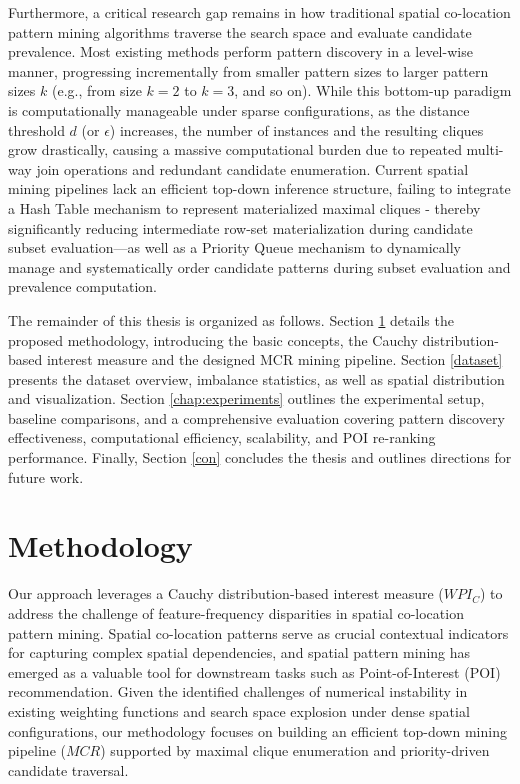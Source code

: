\documentclass[12pt, letterpaper]{template}
\theoremstyle{definition}
\begin{document}
Furthermore, a critical research gap remains in how traditional spatial co-location pattern mining algorithms traverse the search space and evaluate candidate prevalence. Most existing methods perform pattern discovery in a level-wise manner, progressing incrementally from smaller pattern sizes to larger pattern sizes $k$ (e.g., from size $k=2$ to $k=3$, and so on). While this bottom-up paradigm is computationally manageable under sparse configurations, as the distance threshold $d$ (or $\epsilon$) increases, the number of instances and the resulting cliques grow drastically, causing a massive computational burden due to repeated multi-way join operations and redundant candidate enumeration. Current spatial mining pipelines lack an efficient top-down inference structure, failing to integrate a Hash Table mechanism to represent materialized maximal cliques - thereby significantly reducing intermediate row-set materialization during candidate subset evaluation—as well as a Priority Queue mechanism to dynamically manage and systematically order candidate patterns during subset evaluation and prevalence computation. \cite{maurer1975hash}

The remainder of this thesis is organized as follows. Section \ref{methodology} details the proposed methodology, introducing the basic concepts, the Cauchy distribution-based interest measure and the designed MCR mining pipeline. Section \ref{dataset} presents the dataset overview, imbalance statistics, as well as spatial distribution and visualization. Section \ref{chap:experiments} outlines the experimental setup, baseline comparisons, and a comprehensive evaluation covering pattern discovery effectiveness, computational efficiency, scalability, and POI re-ranking performance. Finally, Section \ref{con} concludes the thesis and outlines directions for future work.

\section{Methodology} \label{methodology}

Our approach leverages a Cauchy distribution-based interest measure ($WPI_C$) to address the challenge of feature-frequency disparities in spatial co-location pattern mining. Spatial co-location patterns serve as crucial contextual indicators for capturing complex spatial dependencies, and spatial pattern mining has emerged as a valuable tool for downstream tasks such as Point-of-Interest (POI) recommendation. Given the identified challenges of numerical instability in existing weighting functions and search space explosion under dense spatial configurations, our methodology focuses on building an efficient top-down mining pipeline ($MCR$) supported by maximal clique enumeration and priority-driven candidate traversal.
\end{document}
